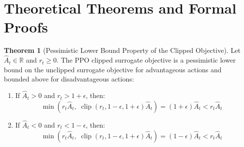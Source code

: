 \documentclass[11pt,a4paper]{article}
\theoremstyle{definition}
\newtheorem{theorem}{\textbf{Theorem}}[section]
\begin{document}
\section{Theoretical Theorems and Formal Proofs}

\begin{theorem}[Pessimistic Lower Bound Property of the Clipped Objective]
Let $\widehat{A}_t \in \mathbb{R}$ and $r_t \ge 0$. The PPO clipped surrogate objective is a pessimistic lower bound on the unclipped surrogate objective for advantageous actions and bounded above for disadvantageous actions:
\begin{enumerate}
    \item If $\widehat{A}_t > 0$ and $r_t > 1 + \epsilon$, then:
    {\boldmath
    \begin{equation}
    \min\left( r_t \widehat{A}_t, \; \operatorname{clip}(r_t, 1 - \epsilon, 1 + \epsilon) \widehat{A}_t \right) = (1 + \epsilon) \widehat{A}_t < r_t \widehat{A}_t
    \end{equation}
    }
    \item If $\widehat{A}_t < 0$ and $r_t < 1 - \epsilon$, then:
    {\boldmath
    \begin{equation}
    \min\left( r_t \widehat{A}_t, \; \operatorname{clip}(r_t, 1 - \epsilon, 1 + \epsilon) \widehat{A}_t \right) = (1 - \epsilon) \widehat{A}_t < r_t \widehat{A}_t
    \end{equation}
    }
\end{enumerate}
\end{theorem}
\end{document}
